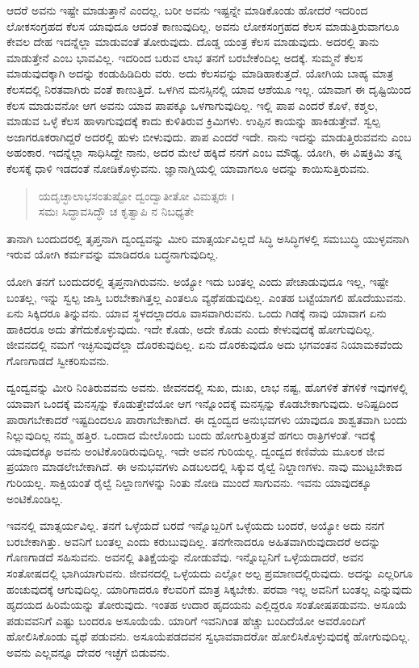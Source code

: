 ಆದರೆ ಅವನು ಇಷ್ಟೇ ಮಾಡುತ್ತಾನೆ ಎಂದಲ್ಲ. ಬರೀ ಅವನು ಇಷ್ಟನ್ನೇ ಮಾಡಿಕೊಂಡು ಹೋದರೆ ಇದರಿಂದ ಲೋಕಸಂಗ್ರಹದ ಕೆಲಸ ಯಾವುದೂ ಆದಂತೆ ಕಾಣುವುದಿಲ್ಲ. ಅವನು ಲೋಕಸಂಗ್ರಹದ ಕೆಲಸ ಮಾಡುತ್ತಿರುವಾಗಲೂ ಕೇವಲ ದೇಹ ಇದನ್ನೆಲ್ಲಾ ಮಾಡುವಂತೆ ತೋರುವುದು. ದೊಡ್ಡ ಯಂತ್ರ ಕೆಲಸ ಮಾಡುವುದು. ಅದರಲ್ಲಿ ತಾನು ಮಾಡುತ್ತೇನೆ ಎಂಬ ಭಾವವಿಲ್ಲ. ಇದರಿಂದ ಬರುವ ಲಾಭ ತನಗೆ ಬರಬೇಕೆಂದಿಲ್ಲ ಅದಕ್ಕೆ. ಸುಮ್ಮನೆ ಕೆಲಸ ಮಾಡುವುದಕ್ಕಾಗಿ ಅದನ್ನು ಕಂಡುಹಿಡಿದಿರು ವರು. ಅದು ಕೆಲಸವನ್ನು ಮಾಡಿಹಾಕುತ್ತದೆ. ಯೋಗಿಯ ಬಾಹ್ಯ ಮಾತ್ರ ಕೆಲಸದಲ್ಲಿ ನಿರತವಾಗಿರು ವಂತೆ ಕಾಣುತ್ತಿದೆ. ಒಳಗಿನ ಮನಸ್ಸಿನಲ್ಲಿ ಯಾವ ಆಶೆಯೂ ಇಲ್ಲ. ಯಾವಾಗ ಈ ದೃಷ್ಟಿಯಿಂದ ಕೆಲಸ ಮಾಡುವನೋ ಆಗ ಅವನು ಯಾವ ಪಾಪಕ್ಕೂ ಒಳಗಾಗುವುದಿಲ್ಲ. ಇಲ್ಲಿ ಪಾಪ ಎಂದರೆ ಕೊಳೆ, ಕಶ್ಮಲ, ಮಾಡುವ ಒಳ್ಳೆ ಕೆಲಸ ಹಾಳಾಗುವುದಕ್ಕೆ ಕಾದು ಕುಳಿತಿರುವ ಕ್ರಿಮಿಗಳು. ಉಪ್ಪಿನ ಕಾಯನ್ನು ಹಾಕಿಡುತ್ತೇವೆ. ಸ್ವಲ್ಪ ಅಜಾಗರೂಕರಾಗಿದ್ದರೆ ಅದರಲ್ಲಿ ಹುಳು ಬೀಳುವುದು. ಪಾಪ ಎಂದರೆ ಇದೇ. ನಾನು ಇದನ್ನು ಮಾಡುತ್ತಿರುವವನು ಎಂಬ ಅಹಂಕಾರ. ಇದನ್ನೆಲ್ಲಾ ಸಾಧಿಸಿದ್ದೇ ನಾನು, ಅದರ ಮೇಲೆ ಹಕ್ಕಿದೆ ನನಗೆ ಎಂಬ ಮೌಢ್ಯ. ಯೋಗಿ, ಈ ವಿಷಕ್ರಿಮಿ ತನ್ನ ಕೆಲಸಕ್ಕೆ ಧಾಳಿ ಇಡದಂತೆ ನೋಡಿಕೊಳ್ಳುವನು. ಜ್ಞಾನಾಗ್ನಿಯಲ್ಲಿ ಯಾವಾಗಲೂ ಅದನ್ನು ಕಾಯಿಸುತ್ತಿರುವನು.

\begin{verse}
ಯದೃಚ್ಛಾಲಾಭಸಂತುಷ್ಟೋ ದ್ವಂದ್ವಾತೀತೋ ವಿಮತ್ಸರಃ ।\\ಸಮಃ ಸಿದ್ಧಾವಸಿದ್ಧೌ ಚ ಕೃತ್ವಾಪಿ ನ ನಿಬಧ್ಯತೇ 
\end{verse}

{\small ತಾನಾಗಿ ಬಂದುದರಲ್ಲಿ ತೃಪ್ತನಾಗಿ ದ್ವಂದ್ವವನ್ನು ಮೀರಿ ಮಾತ್ಸರ್ಯವಿಲ್ಲದೆ ಸಿದ್ಧಿ ಅಸಿದ್ಧಿಗಳಲ್ಲಿ ಸಮಬುದ್ಧಿ ಯುಳ್ಳವನಾಗಿ ಇರುವ ಯೋಗಿ ಕರ್ಮವನ್ನು ಮಾಡಿದರೂ ಬದ್ಧನಾಗುವುದಿಲ್ಲ.}

ಯೋಗಿ ತನಗೆ ಬಂದುದರಲ್ಲಿ ತೃಪ್ತನಾಗಿರುವನು. ಅಯ್ಯೋ ಇದು ಬಂತಲ್ಲ ಎಂದು ಪೇಚಾಡುವುದೂ ಇಲ್ಲ, ಇಷ್ಟೇ ಬಂತಲ್ಲ, ಇನ್ನು ಸ್ವಲ್ಪ ಜಾಸ್ತಿ ಬರಬೇಕಾಗಿತ್ತಲ್ಲ ಎಂತಲೂ ವ್ಯಥೆಪಡುವುದಿಲ್ಲ. ಎಂತಹ ಬಟ್ಟೆಯಾಗಲಿ ಹೊದೆಯುವನು. ಏನು ಸಿಕ್ಕಿದರೂ ತಿನ್ನುವನು. ಯಾವ ಸ್ಥಳದಲ್ಲಾದರೂ ವಾಸವಾಗಿರುವನು. ಒಂದು ಗಿಡಕ್ಕೆ ನಾವು ಯಾವಾಗ ಏನು ಹಾಕಿದರೂ ಅದು ತೆಗೆದುಕೊಳ್ಳುವುದು. ಇದೇ ಕೊಡು, ಅದೇ ಕೊಡು ಎಂದು ಕೇಳುವುದಕ್ಕೆ ಹೋಗುವುದಿಲ್ಲ. ಜೀವನದಲ್ಲಿ ನಮಗೆ ಇಚ್ಛಿಸುವುದೆಲ್ಲಾ ದೊರಕುವುದಿಲ್ಲ. ಏನು ದೊರಕುವುದೊ ಅದು ಭಗವಂತನ ನಿಯಾಮಕವೆಂದು ಗೊಣಗಾಡದೆ ಸ್ವೀಕರಿಸುವನು.

ದ್ವಂದ್ವವನ್ನು ಮೀರಿ ನಿಂತಿರುವವನು ಅವನು. ಜೀವನದಲ್ಲಿ ಸುಖ, ದುಃಖ, ಲಾಭ ನಷ್ಟ, ಹೊಗಳಿಕೆ ತೆಗಳಿಕೆ ಇವುಗಳಲ್ಲಿ ಯಾವಾಗ ಒಂದಕ್ಕೆ ಮನಸ್ಸನ್ನು ಕೊಡುತ್ತೇವೆಯೋ ಆಗ ಇನ್ನೊಂದಕ್ಕೆ ಮನಸ್ಸನ್ನು ಕೊಡಬೇಕಾಗುವುದು. ಅನಿಷ್ಟದಿಂದ ಪಾರಾಗಬೇಕಾದರೆ ಇಷ್ಟದಿಂದಲೂ ಪಾರಾಗಬೇಕಾಗಿದೆ. ಈ ದ್ವಂದ್ವದ ಅನುಭವಗಳು ಯಾವುದೂ ಶಾಶ್ವತವಾಗಿ ಬಂದು ನಿಲ್ಲುವುದಿಲ್ಲ ನಮ್ಮ ಹತ್ತಿರ. ಒಂದಾದ ಮೇಲೊಂದು ಬಂದು ಹೋಗುತ್ತಿರುತ್ತವೆ ಹಗಲು ರಾತ್ರಿಗಳಂತೆ. ಇದಕ್ಕೆ ಯಾವುದಕ್ಕೂ ಅವನು ಅಂಟಿಕೊಂಡಿರುವುದಿಲ್ಲ. ಇದೇ ಅವನ ಗುರಿಯಲ್ಲ. ದ್ವಂದ್ವದ ಕಣಿವೆಯ ಮೂಲಕ ಜೀವ ಪ್ರಯಾಣ ಮಾಡಲೇಬೇಕಾಗಿದೆ. ಈ ಅನುಭವಗಳು ಎಡಬಲದಲ್ಲಿ ಸಿಕ್ಕುವ ರೈಲ್ವೆ ನಿಲ್ದಾಣಗಳು. ನಾವು ಮುಟ್ಟಬೇಕಾದ ಗುರಿಯಲ್ಲ. ಸಾಕ್ಷಿಯಂತೆ ರೈಲ್ವೆ ನಿಲ್ದಾಣಗಳನ್ನು ನಿಂತು ನೋಡಿ ಮುಂದೆ ಸಾಗುವನು. ಇವನು ಯಾವುದಕ್ಕೂ ಅಂಟಿಕೊಂಡಿಲ್ಲ.

ಇವನಲ್ಲಿ ಮಾತ್ಸರ್ಯವಿಲ್ಲ. ತನಗೆ ಒಳ್ಳೆಯದೆ ಬರದೆ ಇನ್ನೊಬ್ಬರಿಗೆ ಒಳ್ಳೆಯದು ಬಂದರೆ, ಅಯ್ಯೋ ಅದು ನನಗೆ ಬರಬೇಕಾಗಿತ್ತು. ಅವನಿಗೆ ಬಂತಲ್ಲ ಎಂದು ಕರುಬುವುದಿಲ್ಲ. ತನಗೇನಾದರೂ ಅಹಿತವಾಗಿರುವುದಾದರೆ ಅದನ್ನು ಗೊಣಗಾಡದೆ ಸಹಿಸುವನು. ಅವನಲ್ಲಿ ತಿತಿಕ್ಷೆಯನ್ನು ನೋಡುವೆವು. ಇನ್ನೊಬ್ಬನಿಗೆ ಒಳ್ಳೆಯದಾದರೆ, ಅವನ ಸಂತೋಷದಲ್ಲಿ ಭಾಗಿಯಾಗುವನು. ಜೀವನದಲ್ಲಿ ಒಳ್ಳೆಯದು ಎಲ್ಲೋ ಅಲ್ಪ ಪ್ರಮಾಣದಲ್ಲಿರುವುದು. ಅದನ್ನು ಎಲ್ಲರಿಗೂ ಹಂಚುವುದಕ್ಕೆ ಆಗುವುದಿಲ್ಲ. ಯಾರಿಗಾದರೂ ಕೆಲವರಿಗೆ ಮಾತ್ರ ಸಿಕ್ಕಬೇಕು. ಪರವಾ ಇಲ್ಲ ಅವನಿಗೆ ಬಂತಲ್ಲ ಎನ್ನುವುದು ಹೃದಯದ ಹಿರಿಮೆಯನ್ನು ತೋರುವುದು. ಇಂತಹ ಉದಾರ ಹೃದಯನು ಎಲ್ಲಿದ್ದರೂ ಸಂತೋಷಪಡುವನು. ಅಸೂಯೆ ಪಡುವವನಿಗೆ ಎಷ್ಟು ಬಂದರೂ ಅಸೂಯೆಯೆ. ಯಾರಿಗೆ ಇವನಿಗಿಂತ ಹೆಚ್ಚು ಬಂದಿದೆಯೋ ಅವರೊಂದಿಗೆ ಹೋಲಿಸಿಕೊಂಡು ವ್ಯಥೆ ಪಡುವನು. ಅಸೂಯೆಪಡದವನ ಸ್ವಭಾವವಾದರೋ ಹೋಲಿಸಿಕೊಳ್ಳುವುದಕ್ಕೆ ಹೋಗುವುದಿಲ್ಲ. ಅವನು ಎಲ್ಲವನ್ನೂ ದೇವರ ಇಚ್ಛೆಗೆ ಬಿಡುವನು.

